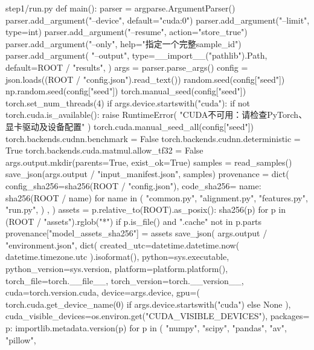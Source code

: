 \begin{appendices}
\begin{Python}{step1/run.py}
def main():
    parser = argparse.ArgumentParser()
    parser.add_argument("--device", default="cuda:0")
    parser.add_argument("--limit", type=int)
    parser.add_argument("--resume", action="store_true")
    parser.add_argument("--only", help="指定一个完整sample_id")
    parser.add_argument(
        "--output",
        type=__import__("pathlib").Path,
        default=ROOT / "results",
    )
    args = parser.parse_args()
    config = json.loads((ROOT / "config.json").read_text())
    random.seed(config["seed"])
    np.random.seed(config["seed"])
    torch.manual_seed(config["seed"])
    torch.set_num_threads(4)
    if args.device.startswith("cuda"):
        if not torch.cuda.is_available():
            raise RuntimeError(
                "CUDA不可用：请检查PyTorch、显卡驱动及设备配置"
            )
        torch.cuda.manual_seed_all(config["seed"])
        torch.backends.cudnn.benchmark = False
        torch.backends.cudnn.deterministic = True
        torch.backends.cuda.matmul.allow_tf32 = False
    args.output.mkdir(parents=True, exist_ok=True)
    samples = read_samples()
    save_json(args.output / "input_manifest.json", samples)
    provenance = dict(
        config_sha256=sha256(ROOT / "config.json"),
        code_sha256={
            name: sha256(ROOT / name)
            for name in (
                "common.py",
                "alignment.py",
                "features.py",
                "run.py",
            )
        },
    )
    assets = {
        p.relative_to(ROOT).as_posix(): sha256(p)
        for p in (ROOT / "assets").rglob("*")
        if p.is_file() and ".cache" not in p.parts
    }
    provenance["model_assets_sha256"] = assets
    save_json(
        args.output / "environment.json",
        dict(
            created_utc=datetime.datetime.now(
                datetime.timezone.utc
            ).isoformat(),
            python=sys.executable,
            python_version=sys.version,
            platform=platform.platform(),
            torch_file=torch.__file__,
            torch_version=torch.__version__,
            cuda=torch.version.cuda,
            device=args.device,
            gpu=(
                torch.cuda.get_device_name(0)
                if args.device.startswith("cuda")
                else None
            ),
            cuda_visible_devices=os.environ.get("CUDA_VISIBLE_DEVICES"),
            packages={
                p: importlib.metadata.version(p)
                for p in (
                    "numpy",
                    "scipy",
                    "pandas",
                    "av",
                    "pillow",
}
\end{Python}
\end{appendices}
